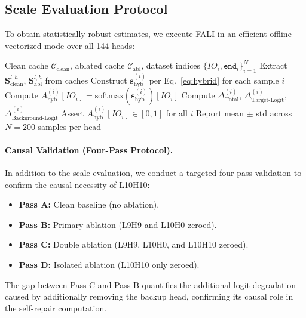 \documentclass[10pt]{article} %
\begin{document}
\subsection{Scale Evaluation Protocol}
\label{subsec:scale}

To obtain statistically robust estimates, we execute FALI in an efficient
offline vectorized mode over all 144 heads:

\begin{algorithm}[t]
\caption{Vectorized FALI across all heads}
{\footnotesize
\begin{algorithmic}[1]
  \Require Clean cache $\mathcal{C}_\text{clean}$, ablated cache $\mathcal{C}_\text{abl}$,
           dataset indices $\{IO_i, \texttt{end}_i\}_{i=1}^N$
      \State Extract $\mathbf{S}^{l,h}_\text{clean}$, $\mathbf{S}^{l,h}_\text{abl}$ from caches
      \State Construct $\mathbf{s}^{(i)}_\text{hyb}$ per Eq.~\ref{eq:hybrid} for each sample $i$
      \State Compute $A^{(i)}_\text{hyb}[IO_i] = \text{softmax}(\mathbf{s}^{(i)}_\text{hyb})[IO_i]$
      \State Compute $\Delta^{(i)}_\text{Total}$, $\Delta^{(i)}_\text{Target-Logit}$, $\Delta^{(i)}_\text{Background-Logit}$
      \State Assert $A^{(i)}_\text{hyb}[IO_i] \in [0, 1]$ for all $i$
    \EndFor
  \EndFor
  \State Report mean $\pm$ std across $N=200$ samples per head
\end{algorithmic}
}
\end{algorithm}

\paragraph{Causal Validation (Four-Pass Protocol).} In addition to the
scale evaluation, we conduct a targeted four-pass validation to confirm the
causal necessity of L10H10:
\begin{itemize}
  \item \textbf{Pass A:} Clean baseline (no ablation).
  \item \textbf{Pass B:} Primary ablation (L9H9 and L10H0 zeroed).
  \item \textbf{Pass C:} Double ablation (L9H9, L10H0, and L10H10 zeroed).
  \item \textbf{Pass D:} Isolated ablation (L10H10 only zeroed).
\end{itemize}
The gap between Pass C and Pass B quantifies the additional logit degradation
caused by additionally removing the backup head, confirming its causal role in
the self-repair computation.
\end{document}
